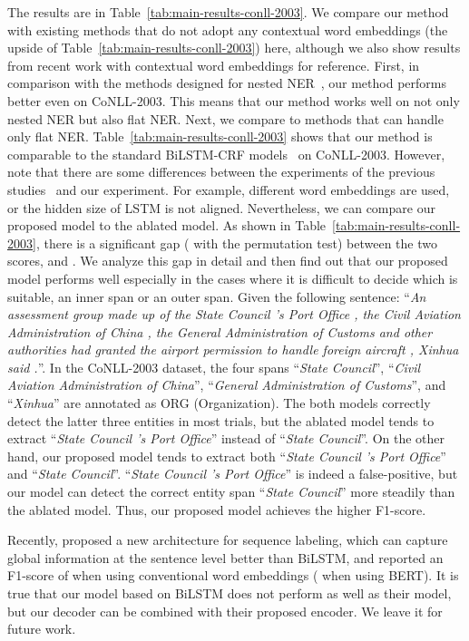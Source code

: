 \documentclass[11pt,a4paper]{article}
\def\tabref#1{Table~\ref{#1}}
\begin{document}
The results are in \tabref{tab:main-results-conll-2003}.
We compare our method with existing methods that do not adopt any contextual word embeddings (the upside of \tabref{tab:main-results-conll-2003}) here, although we also show results from recent work with contextual word embeddings for reference.
First, in comparison with the methods designed for nested NER~\cite{wang-lu-2018-neural,strakova-etal-2019-neural}, our method performs better even on CoNLL-2003.
This means that our method works well on not only nested NER but also flat NER.
Next, we compare to methods that can handle only flat NER.
\tabref{tab:main-results-conll-2003} shows that our method is comparable to the standard BiLSTM-CRF models~\cite{lample-etal-2016-neural,ma-hovy-2016-end} on CoNLL-2003.
However, note that there are some differences between the experiments of the previous studies~\cite{lample-etal-2016-neural,ma-hovy-2016-end} and our experiment.
For example, different word embeddings are used, or the hidden size of LSTM is not aligned.
Nevertheless, we can compare our proposed model to the ablated model.
As shown in \tabref{tab:main-results-conll-2003}, there is a significant gap ( with the permutation test) between the two scores,  and .
We analyze this gap in detail and then find out that our proposed model performs well especially in the cases where it is difficult to decide which is suitable, an inner span or an outer span.
Given the following sentence: ``{\it An assessment group made up of the State Council 's Port Office , the Civil Aviation Administration of China , the General Administration of Customs and other authorities had granted the airport permission to handle foreign aircraft , Xinhua said .}''.
In the CoNLL-2003 dataset, the four spans ``{\it State Council}'', ``{\it Civil Aviation Administration of China}'', ``{\it General Administration of Customs}'', and ``{\it Xinhua}'' are annotated as ORG (Organization).
The both models correctly detect the latter three entities in most trials, but the ablated model tends to extract ``{\it State Council 's Port Office}'' instead of ``{\it State Council}''.
On the other hand, our proposed model tends to extract both ``{\it State Council 's Port Office}'' and ``{\it State Council}''.
``{\it State Council 's Port Office}'' is indeed a false-positive, but our model can detect the correct entity span ``{\it State Council}'' more steadily than the ablated model.
Thus, our proposed model achieves the higher F1-score.

Recently, \citet{liu-etal-2019-gcdt} proposed a new architecture for sequence labeling, which can capture global information at the sentence level better than BiLSTM, and reported an F1-score of  when using conventional word embeddings ( when using BERT).
It is true that our model based on BiLSTM does not perform as well as their model, but our decoder can be combined with their proposed encoder.
We leave it for future work.
\end{document}
